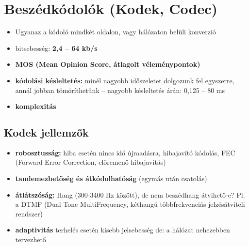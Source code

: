 \documentclass[10pt,a4paper]{article}
\begin{document}
\section{Beszédkódolók (Kodek, Codec)}
\begin{itemize}
	\item Ugyanaz a kódoló mindkét oldalon, vagy hálózaton belüli konverzió
	\item bitsebesség: \textbf{2,4 -- 64 kb/s}
	\item \textbf{MOS (Mean Opinion Score, átlagolt véleménypontok)}
	\item \textbf{kódolási késleltetés:} minél nagyobb időszeletet dolgozunk fel egyszerre, annál jobban
	tömöríthetünk – nagyobb késleltetés árán: 0,125 – 80 ms
	\item \textbf{komplexitás}
\end{itemize}
\subsection{Kodek jellemzők}
\begin{itemize}
	\item \textbf{robosztusság:} hiba esetén nincs idő újraadásra, hibajavító kódolás, FEC (Forward Error Correction, előremenő hibajavítás)
	\item \textbf{tandemezhetőség és átkódolhatóság} (egymás után csatolás)
	\item \textbf{átlátszóság:} Hang (300-3400 Hz között), de nem beszédhang átvihető-e?
	\subitem Pl. a DTMF (Dual Tone MultiFrequency, kéthangú többfrekvenciás
	jelzésátviteli rendszer)
	\item \textbf{adaptivitás}
	\subitem terhelés esetén kisebb jelsebesség
	\subitem de: a hálózat nehezebben tervezhető
\end{itemize}
\end{document}
